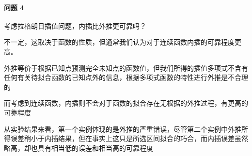 \documentclass[11pt]{article}
\begin{document}
    \hypertarget{ux95eeux9898-4}{%
\paragraph{问题 4}\label{ux95eeux9898-4}}

考虑拉格朗日插值问题，内插比外推更可靠吗？

不一定，这取决于函数的性质，但通常我们认为对于连续函数内插的可靠程度更高。

外推等价于根据已知点预测完全未知点的函数值，但我们所得的插值多项式不含有任何有关待拟合函数的已知点外的信息，根据多项式函数的特性进行外推是不合理的

而考虑到连续函数，内插则不会对于函数的拟合存在无根据的外推过程，有更高的可靠程度

从实验结果来看，第一个实例体现的是外推的严重错误，尽管第二个实例中外推所得误差稍小于内插结果，但在事实上这只是所选区间拟合的巧合，而内插误差虽然略高，却也具有相当低的误差和相当高的可靠程度
\end{document}
